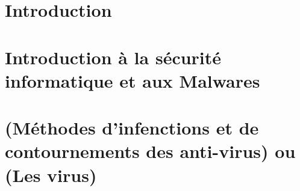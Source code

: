 \documentclass[12pt]{report}
\begin{document}


\renewcommand{\contentsname}{Sommaire}
\tableofcontents
\listoffigures
\listoftables

\chapter*{Introduction}



\chapter{Introduction à la sécurité informatique et aux Malwares}


\chapter{(Méthodes d'infenctions et de contournements des anti-virus) ou (Les virus)}

\end{document}
